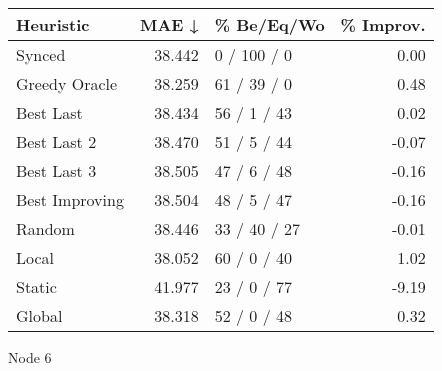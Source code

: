 \begin{tabular}{lrlr}
\toprule
\textbf{Heuristic} & \textbf{MAE ↓} & \textbf{\% Be/Eq/Wo} & \textbf{\% Improv.} \\
\midrule
            Synced &         38.442 &          0 / 100 / 0 &                0.00 \\
     Greedy Oracle &         38.259 &          61 / 39 / 0 &                0.48 \\
         Best Last &         38.434 &          56 / 1 / 43 &                0.02 \\
       Best Last 2 &         38.470 &          51 / 5 / 44 &               -0.07 \\
       Best Last 3 &         38.505 &          47 / 6 / 48 &               -0.16 \\
    Best Improving &         38.504 &          48 / 5 / 47 &               -0.16 \\
            Random &         38.446 &         33 / 40 / 27 &               -0.01 \\
             Local &         38.052 &          60 / 0 / 40 &                1.02 \\
            Static &         41.977 &          23 / 0 / 77 &               -9.19 \\
            Global &         38.318 &          52 / 0 / 48 &                0.32 \\
\bottomrule
\end{tabular}
\caption{Node 6}
\label{tab:non_lr01_le1_bs4_6}
